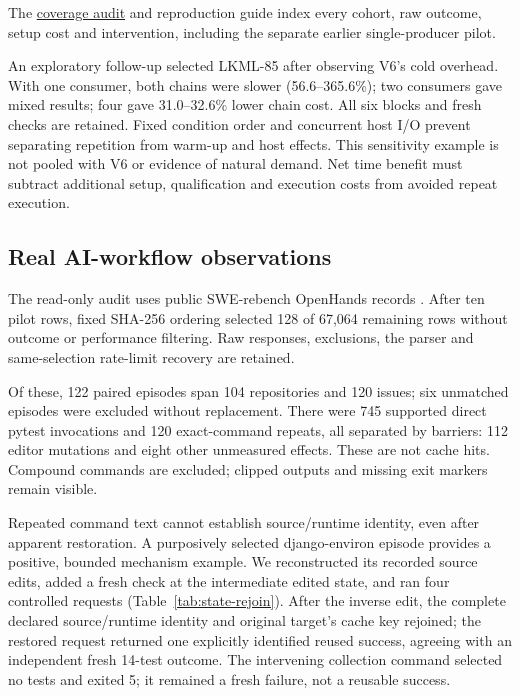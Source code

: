 \documentclass[preprint,12pt,a4paper]{elsarticle}
\begin{document}
The \href{https://github.com/floxy-21/zerorun-research/blob/6a2aab778a290102dbe4c8652eefb3310d15d1e0/research/softwarex/APPLICATION_COVERAGE_AUDIT.md}{coverage audit} and reproduction guide index every cohort, raw outcome, setup cost and intervention, including the separate earlier single-producer pilot.

An exploratory follow-up selected LKML-85 after observing V6's cold overhead. With one consumer, both chains were slower (56.6--365.6\%); two consumers gave mixed results; four gave 31.0--32.6\% lower chain cost. All six blocks and fresh checks are retained. Fixed condition order and concurrent host I/O prevent separating repetition from warm-up and host effects. This sensitivity example is not pooled with V6 or evidence of natural demand. Net time benefit must subtract additional setup, qualification and execution costs from avoided repeat execution.
\endgroup

\subsection{Real AI-workflow observations}
The read-only audit uses public SWE-rebench OpenHands records \cite{swerebenchtrajectories,badertdinov2025swerebench}. After ten pilot rows, fixed SHA-256 ordering selected 128 of 67,064 remaining rows without outcome or performance filtering. Raw responses, exclusions, the parser and same-selection rate-limit recovery are retained.

Of these, 122 paired episodes span 104 repositories and 120 issues; six unmatched episodes were excluded without replacement. There were 745 supported direct pytest invocations and 120 exact-command repeats, all separated by barriers: 112 editor mutations and eight other unmeasured effects. These are not cache hits. Compound commands are excluded; clipped outputs and missing exit markers remain visible.

Repeated command text cannot establish source/runtime identity, even after apparent restoration. A purposively selected django-environ episode provides a positive, bounded mechanism example. We reconstructed its recorded source edits, added a fresh check at the intermediate edited state, and ran four controlled requests (Table~\ref{tab:state-rejoin}). After the inverse edit, the complete declared source/runtime identity and original target's cache key rejoined; the restored request returned one explicitly identified reused success, agreeing with an independent fresh 14-test outcome. The intervening collection command selected no tests and exited 5; it remained a fresh failure, not a reusable success.
\end{document}

